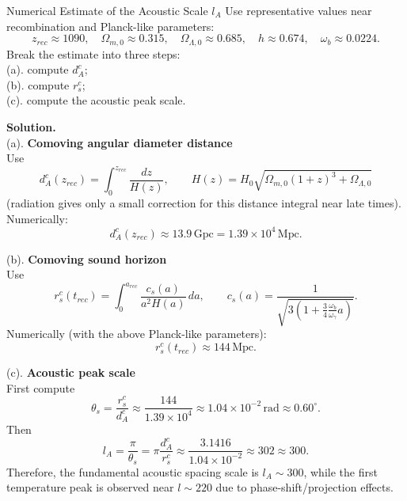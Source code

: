 \clearpage
\begin{example}{Numerical Estimate of the Acoustic Scale $l_A$}{}
    Use representative values near recombination and Planck-like parameters:
    \[
        z_{rec}\approx 1090,
        \quad \Omega_{m,0}\approx 0.315,
        \quad \Omega_{\Lambda,0}\approx 0.685,
        \quad h\approx 0.674,
        \quad \omega_b\approx 0.0224.
    \]
    Break the estimate into three steps: \\
    (a). compute $d_A^c$; \\
    (b). compute $r_s^c$; \\
    (c). compute the acoustic peak scale.

    \bigskip\textbf{Solution.}\quad \\
    (a). \textbf{Comoving angular diameter distance} \\
    Use
    \[
        d_A^c(z_{rec}) = \int_0^{z_{rec}} \frac{dz}{H(z)},
        \qquad
        H(z)=H_0\sqrt{\Omega_{m,0}(1+z)^3+\Omega_{\Lambda,0}}
    \]
    (radiation gives only a small correction for this distance integral near late times). Numerically:
    \[
        d_A^c(z_{rec}) \approx 13.9\,\mathrm{Gpc} = 1.39\times 10^4\,\mathrm{Mpc}.
    \]

    (b). \textbf{Comoving sound horizon} \\
    Use
    \[
        r_s^c(t_{rec}) = \int_0^{a_{rec}} \frac{c_s(a)}{a^2 H(a)}\,da,
        \qquad
        c_s(a)=\frac{1}{\sqrt{3\left(1+\frac{3}{4}\frac{\omega_b}{\omega_\gamma}a\right)}}.
    \]
    Numerically (with the above Planck-like parameters):
    \[
        r_s^c(t_{rec}) \approx 144\,\mathrm{Mpc}.
    \]

    (c). \textbf{Acoustic peak scale} \\
    First compute
    \[
        \theta_s = \frac{r_s^c}{d_A^c}
        \approx \frac{144}{1.39\times 10^4}
        \approx 1.04\times 10^{-2}\,\mathrm{rad}
        \approx 0.60^\circ.
    \]
    Then
    \[
        l_A = \frac{\pi}{\theta_s}
        = \pi\frac{d_A^c}{r_s^c}
        \approx \frac{3.1416}{1.04\times10^{-2}}
        \approx 302 \approx 300.
    \]
    Therefore, the fundamental acoustic spacing scale is $l_A\sim 300$, while the first temperature peak is observed near $l\sim 220$ due to phase-shift/projection effects.
\end{example}

